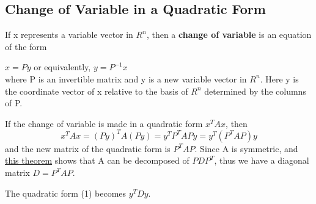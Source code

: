 \subsection{Change of Variable in a Quadratic Form}
\begin{definition}
    If x represents a variable vector in \(R^n\), then a \textbf{change of variable} is an equation of the form

    \(x = Py\) or equivalently, \(y = P^{-1}x\)  \\
    where P is an invertible matrix and y is a new variable vector in \(R^n\). Here y is the coordinate vector of x relative to the basis of \(R^n\) determined by the columns of P. 
\end{definition}
\begin{remark}
    If the change of variable is made in a quadratic form \(x^T Ax\), then
    \[
        x^TAx = (Py)^T A (Py) = y^T P^T APy = y^T(P^TAP)y  \tag{1}
    \]
    and the new matrix of the quadratic form is \(P^T AP\). 
    Since A is symmetric, and \hyperref[theorem: 7.1.2]{this theorem} shows that A can be decomposed of \(P DP^T\), thus we have a diagonal matrix \(D = P^T AP\). 

    The quadratic form (1) becomes \(y^TDy\). 
\end{remark}





